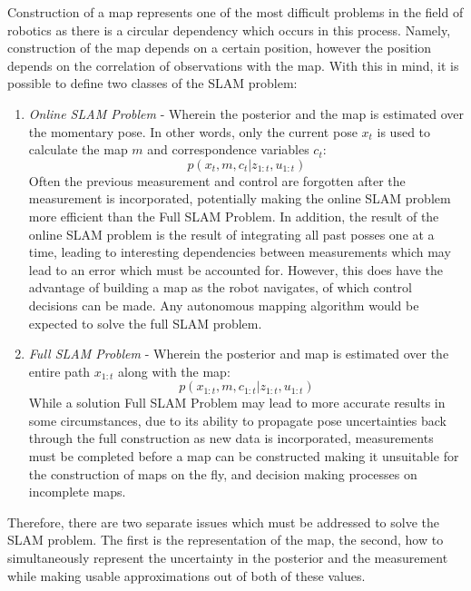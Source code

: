 \documentclass[english]{article}
\begin{document}
Construction of a map represents one of the most difficult problems in the field of robotics as there is a circular dependency which occurs in this process. Namely, construction of the map depends on a certain position, however the position depends on the correlation of observations with the map. With this in mind, it is possible to define two classes of the SLAM problem:
\begin{enumerate}
 \item \emph{Online SLAM Problem} - Wherein the posterior and the map is estimated over the momentary pose. In other words, only the current pose $x_t$ is used to calculate the map $m$ and correspondence variables $c_t$:
	\begin{equation}
	 p\left(x_t, m, c_t | z_{1:t}, u_{1:t}\right)
	\end{equation}
	Often the previous measurement and control are forgotten after the measurement is incorporated, potentially making the online SLAM problem more efficient than the Full SLAM Problem. In addition, the result of the online SLAM problem is the result of integrating all past posses one at a time, leading to interesting dependencies between measurements which may lead to an error which must be accounted for. However, this does have the advantage of building a map as the robot navigates, of which control decisions can be made. Any autonomous mapping algorithm would be expected to solve the full SLAM problem.
 \item \emph{Full SLAM Problem} - Wherein the posterior and map is estimated over the entire path $x_{1:t}$ along with the map:
  \begin{equation}
   p\left(x_{1:t}, m, c_{1:t} | z_{1:t}, u_{1:t}\right)
  \end{equation}
  While a solution Full SLAM Problem may lead to more accurate results in some circumstances, due to its ability to propagate pose uncertainties back through the full construction as new data is incorporated, measurements must be completed before a map can be constructed making it unsuitable for the construction of maps on the fly, and decision making processes on incomplete maps.
\end{enumerate}

Therefore, there are two separate issues which must be addressed to solve the SLAM problem. The first is the representation of the map, the second, how to simultaneously represent the uncertainty in the posterior and the measurement while making usable approximations out of both of these values. 
\end{document}
